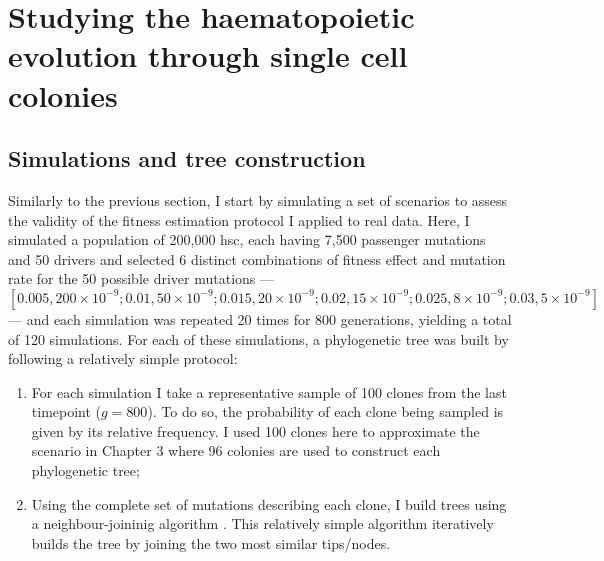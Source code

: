 \begin{figure}[!ht]
	\label{fig:heatmap-ks-d}
\end{figure}

\section{Studying the haematopoietic evolution through single cell colonies}

\subsection{Simulations and tree construction}

Similarly to the previous section, I start by simulating a set of scenarios to assess the validity of the fitness estimation protocol I applied to real data. Here, I simulated a population of 200,000 \ac{hsc}, each having 7,500 passenger mutations and 50 drivers and selected 6 distinct combinations of fitness effect and mutation rate for the 50 possible driver mutations --- $[0.005,200 \times 10^{-9}; 0.01,50 \times 10^{-9}; 0.015,20 \times 10^{-9}; 0.02,15 \times 10^{-9}; 0.025,8 \times 10^{-9}; 0.03,5 \times 10^{-9}]$ --- and each simulation was repeated 20 times for 800 generations, yielding a total of 120 simulations. For each of these simulations, a phylogenetic tree was built by following a relatively simple protocol:

\begin{enumerate}
    \item For each simulation I take a representative sample of 100 clones from the last timepoint ($g = 800$). To do so, the probability of each clone being sampled is given by its relative frequency. I used 100 clones here to approximate the scenario in Chapter 3 where 96 colonies are used to construct each phylogenetic tree;
    \item Using the complete set of mutations describing each clone, I build trees using a neighbour-joininig algorithm \cite{Saitou1987-uq}. This relatively simple algorithm iteratively builds the tree by joining the two most similar tips/nodes. 
\end{enumerate}

